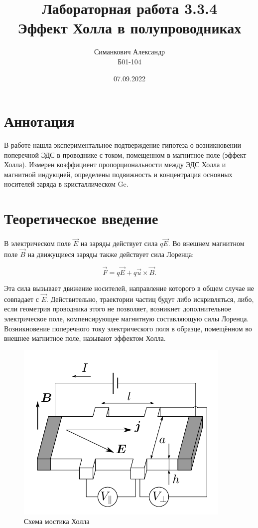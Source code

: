 \documentclass[12pt,a4paper]{article}
\title{Лабораторная работа 3.3.4\\ Эффект Холла в полупроводниках}
\author{Симанкович Александр \\ Б01-104}
\date{07.09.2022}
\begin{document}
	\maketitle
	
	\section*{Аннотация}
	
	В работе нашла экспериментальное подтверждение гипотеза о возникновении поперечной ЭДС в проводнике с током, помещенном в магнитное поле (эффект Холла). Измерен коэффициент пропорциональности между ЭДС Холла и магнитной индукцией, определены подвижность и концентрация основных носителей заряда в кристаллическом Ge.
		
	\section*{Теоретическое введение}
	
	В электрическом поле $\vec{E}$ на заряды действует сила $q\vec{E}$. Во внешнем магнитном поле $\vec{B}$ на движущиеся заряды также действует сила Лоренца:
	
	$$ \vec{F} = q\vec{E} + q\vec{u} \times \vec{B}.$$
	
	Эта сила вызывает движение носителей, направление которого в общем случае не совпадает с $\vec{E}$. Действительно, траектории частиц будут ли­бо искривляться, либо, если геометрия проводника этого не позволя­ет, возникнет дополнительное электрическое поле, компенсирующее маг­нитную составляющую силы Лоренца. Возникновение поперечного току электрического поля в образце, помещённом во внешнее магнитное поле, называют эффектом Холла.
	
	\begin{figure}[h]
		\includegraphics[scale=0.65]{res/scheme_hall.png}
		\caption{Схема мостика Холла}
		\label{scheme_hall}
	\end{figure}
\end{document}
